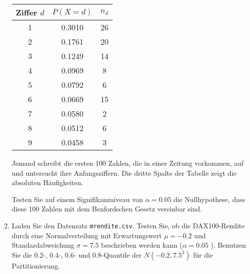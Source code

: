 \documentclass{article}
\begin{document}
\begin{enumerate}
\begin{center}%
\begin{tabular}{|c|c|c|}
\hline
Ziffer $d$ & $P\left( X=d\right) $ & $n_{d}$ \\ \hline\hline
1 & 0.3010 & 26 \\ \hline
2 & 0.1761 & 20 \\ \hline
3 & 0.1249 & 14 \\ \hline
4 & 0.0969 & 8 \\ \hline
5 & 0.0792 & 6 \\ \hline
6 & 0.0669 & 15 \\ \hline
7 & 0.0580 & 2 \\ \hline
8 & 0.0512 & 6 \\ \hline
9 & 0.0458 & 3 \\ \hline
\end{tabular}
\end{center}%

Jemand schreibt die ersten 100 Zahlen, die in einer Zeitung vorkommen, auf
und untersucht ihre Anfangsziffern. Die dritte Spalte der Tabelle zeigt die
absoluten H\"{a}ufigkeiten.

Testen Sie auf einem Signifikanzniveau von $\alpha =0.05$ die Nullhypothese,
dass diese 100 Zahlen mit dem Benfordschen Gesetz vereinbar sind.

\item Laden Sie den Datensatz \texttt{mrendite.csv}. Testen Sie, ob die
DAX100-Rendite durch eine Normalverteilung mit Erwartungswert $\mu =-0.2$
und Standardabweichung $\sigma =7.5$ beschrieben werden kann ($\alpha =0.05$%
). Benutzen Sie die 0.2-, 0.4-, 0.6- und 0.8-Quantile der $N\left(
-0.2,7.5^{2}\right) $ f\"{u}r die Partitionierung.
\end{enumerate}
\end{document}
